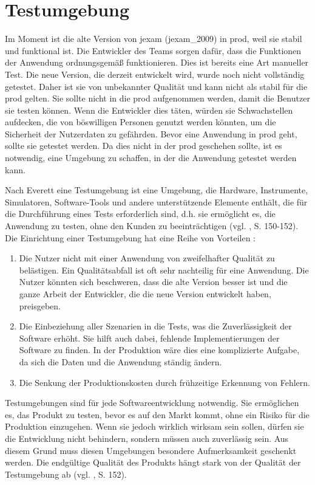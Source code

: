 \section{Testumgebung}

Im Moment ist die alte Version von jexam (\gls{jexam_2009})
in \gls{prod}, weil sie stabil und funktional ist.
Die Entwickler des Teams sorgen dafür, dass die
Funktionen der Anwendung ordnungsgemäß funktionieren.
Dies ist bereits eine Art manueller Test. Die neue
Version, die derzeit entwickelt wird, wurde noch nicht
vollständig getestet. Daher ist sie von unbekannter
Qualität und kann nicht als stabil für die \gls{prod}
gelten. Sie sollte nicht in die \gls{prod} aufgenommen
werden, damit die Benutzer sie testen können.  Wenn
die Entwickler dies täten, würden sie Schwachstellen
aufdecken, die von böswilligen Personen genutzt werden
könnten, um die Sicherheit der Nutzerdaten zu
gefährden. Bevor eine Anwendung in \gls{prod} geht,
sollte sie getestet werden. Da dies nicht in der
\gls{prod} geschehen sollte, ist es notwendig, eine
Umgebung zu schaffen, in der die Anwendung getestet
werden kann.


Nach Everett eine Testumgebung ist eine Umgebung,
die Hardware, Instrumente, Simulatoren, Software-Tools
und andere unterstützende Elemente enthält, die für
die Durchführung eines Tests erforderlich sind,
d.h. sie ermöglicht es, die Anwendung zu testen, ohne
den Kunden zu beeinträchtigen (vgl. \cite{shultz2011software}, S. 150-152).
Die Einrichtung einer Testumgebung hat eine Reihe von Vorteilen :

\noindent
\begin{enumerate}
    \item Die Nutzer nicht mit einer Anwendung von
    zweifelhafter Qualität zu belästigen. Ein
    Qualitätsabfall ist oft sehr nachteilig für eine
    Anwendung. Die Nutzer könnten sich beschweren,
    dass die alte Version besser ist und die ganze
    Arbeit der Entwickler, die die neue Version
    entwickelt haben, preisgeben.

    \item Die Einbeziehung aller Szenarien in die
    Tests, was die Zuverlässigkeit der Software
    erhöht. Sie hilft auch dabei, fehlende
    Implementierungen der Software zu finden. In der
    Produktion wäre dies eine komplizierte Aufgabe, da
    sich die Daten und die Anwendung ständig ändern.

    \item Die Senkung der Produktionskosten durch
    frühzeitige Erkennung von Fehlern.

\end{enumerate}

Testumgebungen sind für jede Softwareentwicklung
notwendig. Sie ermöglichen es, das Produkt zu testen,
bevor es auf den Markt kommt, ohne ein Risiko für die
Produktion einzugehen. Wenn sie jedoch wirklich
wirksam sein sollen, dürfen sie die Entwicklung nicht
behindern, sondern müssen auch zuverlässig sein. Aus
diesem Grund muss diesen Umgebungen besondere
Aufmerksamkeit geschenkt werden. Die endgültige
Qualität des Produkts hängt stark von der Qualität der
Testumgebung ab (vgl. \cite{shultz2011software}, S. 152).

